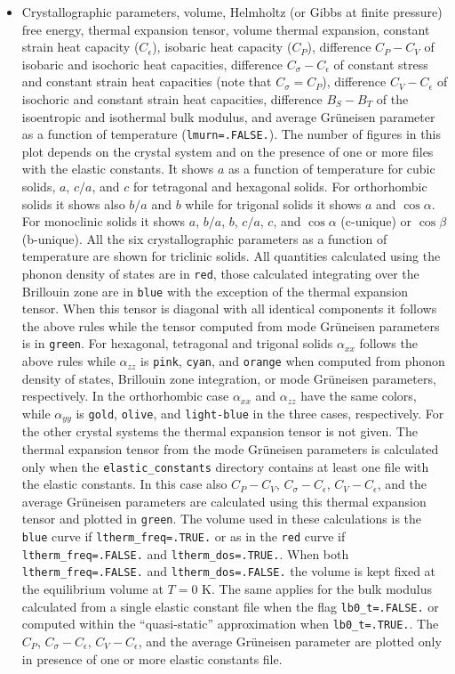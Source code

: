 \documentclass[12pt,a4paper,twoside]{report}
\begin{document}
\begin{itemize}
\item
Crystallographic parameters, volume, Helmholtz (or Gibbs at finite pressure)
free energy, thermal expansion tensor, volume thermal expansion, constant
strain heat capacity ($C_\epsilon$), isobaric heat capacity ($C_P$),
difference $C_P-C_V$ of isobaric and isochoric heat capacities,
difference $C_\sigma-C_\epsilon$ of constant stress and 
constant strain heat capacities (note that $C_\sigma=C_P$), 
difference $C_V-C_\epsilon$ of isochoric and constant strain heat capacities, 
difference $B_S-B_T$ of the isoentropic and isothermal bulk modulus,
and average Gr\"uneisen parameter as a function of temperature 
(\texttt{lmurn=.FALSE.}). The number of
figures in this plot depends on the crystal system and on the presence
of one or more files with the elastic constants. It shows $a$ as a function
of temperature for cubic solids, $a$, $c/a$, and $c$ for tetragonal and 
hexagonal 
solids. For orthorhombic solids it shows also $b/a$ and $b$ while for 
trigonal solids
it shows $a$ and $\cos\alpha$. For monoclinic
solids it shows $a$, $b/a$, $b$, $c/a$, $c$, and $\cos\alpha$ (c-unique) or 
$\cos\beta$ (b-unique). All the six crystallographic parameters 
as a function of temperature are shown for triclinic solids. 
All quantities calculated using the phonon 
density of states are in \texttt{red}, those calculated integrating
over the Brillouin zone are in \texttt{blue} with the exception of the
thermal expansion tensor. When this tensor is diagonal with all identical
components it follows the above rules while the tensor computed 
from mode Gr\"uneisen parameters is in \texttt{green}. For hexagonal,  
tetragonal and trigonal solids $\alpha_{xx}$ follows the above rules 
while $\alpha_{zz}$ is \texttt{pink}, \texttt{cyan}, and \texttt{orange}
when computed from phonon density of states, Brillouin zone integration, 
or mode Gr\"uneisen parameters, respectively. 
In the orthorhombic case $\alpha_{xx}$ and $\alpha_{zz}$ have the same
colors, while $\alpha_{yy}$ is \texttt{gold}, \texttt{olive}, and 
\texttt{light-blue} in the three cases, respectively. For the other
crystal systems the thermal expansion tensor is not given.
The thermal expansion tensor from the mode Gr\"uneisen parameters is 
calculated only when the \texttt{elastic\_constants} directory contains at 
least one file with the elastic constants. In this case also 
$C_P-C_V$, $C_\sigma-C_\epsilon$, $C_V-C_\epsilon$, and the 
average Gr\"uneisen parameters are calculated using this thermal 
expansion tensor and plotted in \texttt{green}.
The volume used in these calculations is the \texttt{blue} curve 
if \texttt{ltherm\_freq=.TRUE.}
or as in the \texttt{red} curve if \texttt{ltherm\_freq=.FALSE.}
and \texttt{ltherm\_dos=.TRUE.}.
When both \texttt{ltherm\_freq=.FALSE.} and \texttt{ltherm\_dos=.FALSE.}
the volume is kept fixed at the equilibrium volume at $T=0$ K.
The same applies for the bulk modulus calculated from a single elastic
constant file when the flag \texttt{lb0\_t=.FALSE.} or computed 
within the ``quasi-static'' approximation when \texttt{lb0\_t=.TRUE.}. 
The $C_P$, $C_\sigma-C_\epsilon$, $C_V-C_\epsilon$, and  
the average Gr\"uneisen parameter are plotted only in presence of 
one or more elastic constants file. 


\end{itemize}
\end{document}
